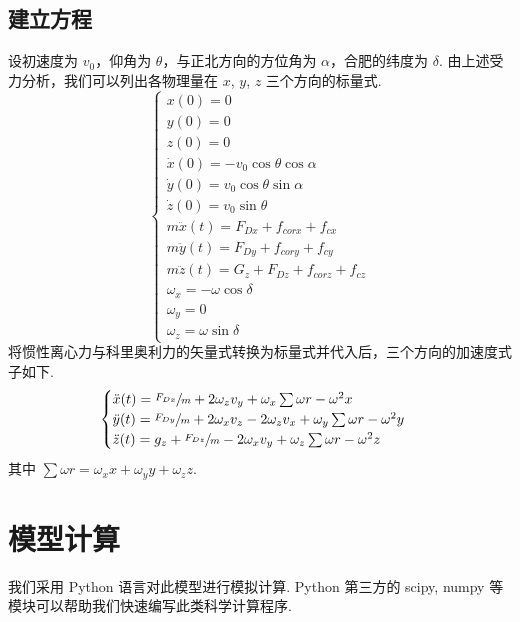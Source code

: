 \documentclass[UTF8]{ctexart}
\begin{document}
		\subsection{建立方程}
		设初速度为 $v_0$，仰角为 $\theta$，与正北方向的方位角为 $\alpha$，合肥的纬度为 $\delta$. 由上述受力分析，我们可以列出各物理量在 $x$, $y$, $z$ 三个方向的标量式.
		$$\begin{cases}
			x(0)=0\\
			y(0)=0\\
			z(0)=0\\
			\dot x(0)=-v_0\cos\theta\cos\alpha\\
			\dot y(0)=v_0\cos\theta\sin\alpha\\
			\dot z(0)=v_0\sin\theta\\
			m\ddot x(t)=F_{Dx}+f_{corx}+f_{cx}\\
			m \ddot y(t)=F_{Dy}+f_{cory}+f_{cy}\\
			m\ddot z(t)=G_z+F_{Dz}+f_{corz}+f_{cz}\\
			\omega_x=-\omega\cos\delta\\
			\omega_y=0\\
			\omega_z=\omega\sin\delta
		\end{cases}$$
		将惯性离心力与科里奥利力的矢量式转换为标量式并代入后，三个方向的加速度式子如下.
		$$\begin{cases}
		\ddot x(t) = \sfrac{F_{Dx}}{m} + 2\omega_z v_y + \omega_x \sum \omega r - \omega^2x\\
		\ddot y(t) = \sfrac{F_{Dy}}{m} + 2\omega_x v_z - 2\omega_z v_x + \omega_y \sum \omega r - \omega^2y\\
		\ddot z(t) = g_z + \sfrac{F_{Dz}}{m} - 2\omega_x v_y + \omega_z \sum \omega r - \omega^2z
		\end{cases}$$
		其中 $\sum \omega r = \omega_x x + \omega_y y + \omega_z z$.
	\section{模型计算}
	我们采用 Python 语言对此模型进行模拟计算. Python 第三方的 scipy, numpy 等模块可以帮助我们快速编写此类科学计算程序.
	
\end{document}
